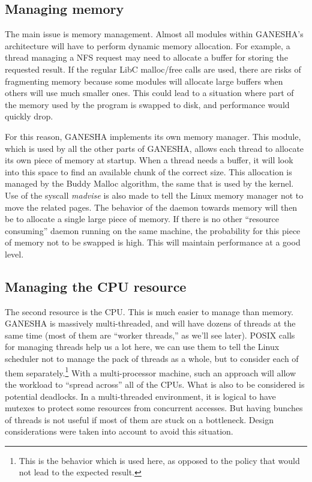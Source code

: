 \documentclass[final]{ols}
\begin{document}
\subsection{Managing memory}
The main issue is memory management. Almost all modules within
GANESHA's architecture will have to perform dynamic memory allocation.
For example, a thread managing a NFS request may need to allocate a
buffer for storing the requested result. If the regular LibC
malloc/\linebreak[0]free calls are used, there are risks of fragmenting memory because
some modules will allocate large buffers when others will use much
smaller ones. This could lead to a situation where part of the memory
used by the program is swapped to disk, and performance would quickly
drop.

For this reason, GANESHA implements its own memory manager. This
module, which is used by all the other parts of GANESHA, allows each
thread to allocate its own piece of memory at startup. When a thread
needs a buffer, it will look into this space to find an available
chunk of the correct size. This allocation is managed by the Buddy
Malloc algorithm, the same that is used by the kernel.  Use of the syscall
\textit{madvise} is also made to tell the Linux memory manager not to move
the related pages.  The behavior of the daemon towards memory will
then be to allocate a single large piece of memory. If there is no
other ``resource consuming'' daemon running on the same machine, the
probability for this piece of memory not to be swapped is high. This
will maintain performance at a good level.

\subsection{Managing the CPU resource}
The second resource is the CPU. This is much easier to manage than memory.
GANESHA is massively multi-threaded, and will have dozens of threads
at the same time (most of them are ``worker threads,'' as we'll see
later). POSIX calls for managing threads help us a lot here, we can
use them to tell the Linux scheduler not to manage the pack of threads
as a whole, but to consider each of them separately.\footnote{This is
the  behavior which is used here, as opposed
to the  policy that would not lead to the
expected result.} With a multi-processor machine, such an approach
will allow the workload to ``spread across'' all of the CPUs. What is also to be
considered is potential deadlocks.  In a multi-threaded environment, it
is logical to have mutexes to protect some resources from concurrent
accesses. But having bunches of threads is not useful if most of them
are stuck on a bottleneck. Design considerations were taken into
account to avoid this situation.
\end{document}
